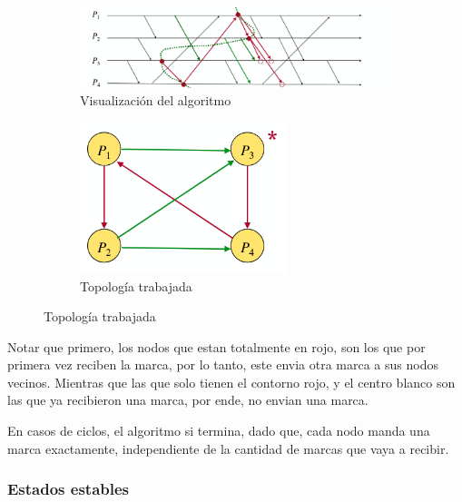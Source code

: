 \begin{figure}[H]
  \centering
  \captionsetup[subfigure]{labelformat=empty}
  \begin{subfigure}[b]{0.3\textwidth}
    \includegraphics[width=\textwidth]{img/Chandy_ver.png}
    \caption{Visualización del algoritmo}
  \end{subfigure}
  \hspace{2mm} %
  \begin{subfigure}[b]{0.2\textwidth}
    \includegraphics[width=\textwidth]{img/Topologia.png}
    \caption{Topología trabajada}
  \end{subfigure}
  \label{fig:imagenes_lado_a_lado}
\end{figure}
Notar que primero, los nodos que estan totalmente en rojo, son los que por primera vez reciben la marca, por lo tanto, este envia otra marca a sus nodos vecinos. Mientras que las que solo tienen el contorno rojo, y el centro blanco son las que ya recibieron una marca, por ende, no envian una marca.

En casos de ciclos, el algoritmo si termina, dado que, cada nodo manda una marca exactamente, independiente de la cantidad de marcas que vaya a recibir. 

\subsubsection{Estados estables}

